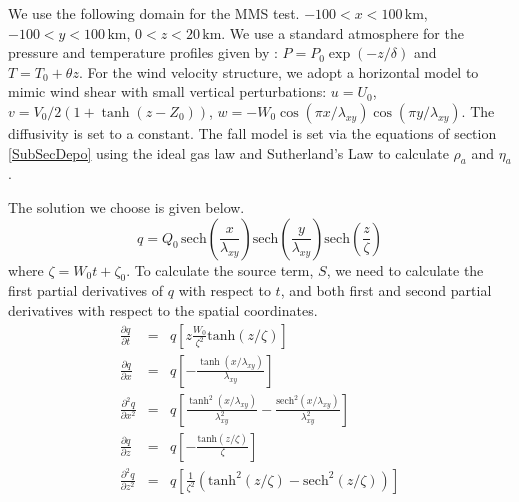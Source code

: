 We use the following domain for the MMS test.
$-100<x<100\, \mathrm{km}$, $-100<y<100\, \mathrm{km}$, $0<z<20 \, \mathrm{km}$.
We use a standard atmosphere for the pressure and temperature profiles given by
:  $P = P_0 \exp (-z/\delta)$ and $T = T_0 + \theta z$.
For the wind velocity structure, we adopt a horizontal model to mimic wind shear with small
vertical perturbations:
$u = U_0$, $v = V_0/2\left( 1 + \tanh ( z-Z_0)\right)$,
$w=-W_0 \cos(\pi x/\lambda_{xy})\cos(\pi y/\lambda_{xy})$.
The diffusivity is set to a constant.
The fall model is set via the equations of section \ref{SubSecDepo} using the ideal gas
law and Sutherland's Law to calculate $\rho_a$ and $\eta_a$.

The solution we choose is given below.
\begin{equation} \label{EqMMSSolution}
q = Q_0 \, \mathrm{sech} \left( \frac{x}{\lambda_{xy}}\right) \mathrm{sech} \left( \frac{y}{\lambda_{xy}}\right)
\mathrm{sech} \left( \frac{z}{\zeta}\right)
\end{equation}
where $\zeta=W_0 t + \zeta_0$.
To calculate the source term, $S$, we need to calculate the first partial derivatives of $q$
with respect to $t$, and both first and second partial derivatives with respect to the
spatial coordinates.
\begin{eqnarray}
\frac{\partial q}{\partial t} &=& q\left[ z \frac{W_0}{\zeta^2} \mathrm{tanh}(z/\zeta)\right] \label{EqMMSQt} \\
\frac{\partial q}{\partial x} &=& q\left[ -\frac{\tanh (x/\lambda_{xy})}{\lambda_{xy}} \right] \label{EqMMSQx} \\
\frac{\partial^2 q}{\partial x^2} &=& q\left[ \frac{\tanh^2 (x/\lambda_{xy})}{\lambda^2_{xy}} - \frac{\mathrm{sech}^2 (x/\lambda_{xy})}{\lambda^2_{xy}}\right]  \label{EqMMSQxx} \\
\frac{\partial q}{\partial z} &=& q \left[ - \frac{\mathrm{tanh}(z/\zeta)}{\zeta}\right]\\ \label{EqMMSQz}
\frac{\partial^2 q}{\partial z^2} &=& q \left[ \frac{1}{\zeta^2}\left( \mathrm{tanh}^2(z/\zeta) - \mathrm{sech}^2(z/\zeta)\right)\right] \label{EqMMSQzz}
\end{eqnarray}
